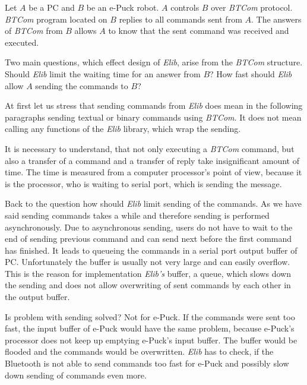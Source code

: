     
  Let $A$ be a PC and $B$ be an e-Puck robot. $A$ controls $B$ over {\it BTCom} protocol. {\it BTCom} program located on $B$ 
  replies to all commands sent from $A$.
  The answers of {\it BTCom} from $B$ allows $A$ to know that the sent command was received and
  executed. 
   
  Two main questions, which effect design of {\it Elib}, arise from the {\it BTCom} structure.
  Should {\it Elib} limit the waiting time for an answer from $B$?
  How fast should {\it Elib} allow $A$ sending the commands to $B$?
   
  At first let us stress that sending commands from {\it Elib} does mean in the following paragraphs
  sending textual or binary commands
  using {\it BTCom}. It does not mean calling any functions of the {\it Elib} library, which wrap the sending. 
   
  It is necessary to understand, that not only executing a {\it BTCom} command, 
  but also a transfer of a command and a transfer of reply take insignificant amount of time. 
  The time is measured from a computer processor's point of view, because
  it is the processor, who is waiting to serial port, which is sending the message.
   
  Back to the question how should {\it Elib} limit sending of the commands.
  As we have said sending commands takes a while and therefore sending is performed asynchronously. 
  Due to asynchronous sending, users do not have to wait to the end of sending previous command and
  can send next before the first command has finished.
  It leads to queueing the commands in a serial port output buffer of PC. Unfortunately the buffer is usually not 
  very large and can easily overflow. 
  This is the reason for implementation {\it Elib's} buffer, a queue, which slows down the sending and does not allow
  overwriting of sent commands by each other in the output buffer. 
   
  Is problem with sending solved? Not for e-Puck. If the commands were sent too fast,
  the input buffer of e-Puck would have the same problem, because e-Puck's processor does not keep up emptying e-Puck's
  input buffer. The buffer would be flooded and the commands would be overwritten. 
  {\it Elib} has to check, if the Bluetooth is not able to send commands too fast for e-Puck
  and possibly slow down sending of commands even more.

   
